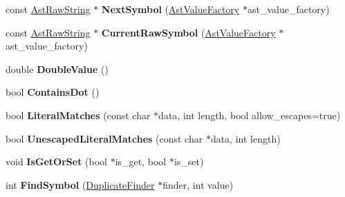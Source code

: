 \begin{DoxyCompactItemize}
\item 
const \hyperlink{classv8_1_1internal_1_1_ast_raw_string}{Ast\+Raw\+String} $\ast$ {\bfseries Next\+Symbol} (\hyperlink{classv8_1_1internal_1_1_ast_value_factory}{Ast\+Value\+Factory} $\ast$ast\+\_\+value\+\_\+factory)\hypertarget{classv8_1_1internal_1_1_scanner_ad16b079af6f99fcb6709a47e638ef105}{}\label{classv8_1_1internal_1_1_scanner_ad16b079af6f99fcb6709a47e638ef105}

\item 
const \hyperlink{classv8_1_1internal_1_1_ast_raw_string}{Ast\+Raw\+String} $\ast$ {\bfseries Current\+Raw\+Symbol} (\hyperlink{classv8_1_1internal_1_1_ast_value_factory}{Ast\+Value\+Factory} $\ast$ast\+\_\+value\+\_\+factory)\hypertarget{classv8_1_1internal_1_1_scanner_a8e8f873d0c027bdac2dd9aaef640ae11}{}\label{classv8_1_1internal_1_1_scanner_a8e8f873d0c027bdac2dd9aaef640ae11}

\item 
double {\bfseries Double\+Value} ()\hypertarget{classv8_1_1internal_1_1_scanner_a86409d59b79b3685549d19b810471f92}{}\label{classv8_1_1internal_1_1_scanner_a86409d59b79b3685549d19b810471f92}

\item 
bool {\bfseries Contains\+Dot} ()\hypertarget{classv8_1_1internal_1_1_scanner_aee9b33e08b8eebe2b64843be1a9cb52f}{}\label{classv8_1_1internal_1_1_scanner_aee9b33e08b8eebe2b64843be1a9cb52f}

\item 
bool {\bfseries Literal\+Matches} (const char $\ast$data, int length, bool allow\+\_\+escapes=true)\hypertarget{classv8_1_1internal_1_1_scanner_a6761ff1548125cd4f1b555eba7b026d1}{}\label{classv8_1_1internal_1_1_scanner_a6761ff1548125cd4f1b555eba7b026d1}

\item 
bool {\bfseries Unescaped\+Literal\+Matches} (const char $\ast$data, int length)\hypertarget{classv8_1_1internal_1_1_scanner_a5c53152d985b1277f58fe1873d8c896d}{}\label{classv8_1_1internal_1_1_scanner_a5c53152d985b1277f58fe1873d8c896d}

\item 
void {\bfseries Is\+Get\+Or\+Set} (bool $\ast$is\+\_\+get, bool $\ast$is\+\_\+set)\hypertarget{classv8_1_1internal_1_1_scanner_a4d10c13a3043358f6a6c224ac8e4685f}{}\label{classv8_1_1internal_1_1_scanner_a4d10c13a3043358f6a6c224ac8e4685f}

\item 
int {\bfseries Find\+Symbol} (\hyperlink{classv8_1_1internal_1_1_duplicate_finder}{Duplicate\+Finder} $\ast$finder, int value)\hypertarget{classv8_1_1internal_1_1_scanner_a485c95dca96855ed382b3324bd5d4d3e}{}\label{classv8_1_1internal_1_1_scanner_a485c95dca96855ed382b3324bd5d4d3e}


\end{DoxyCompactItemize}
